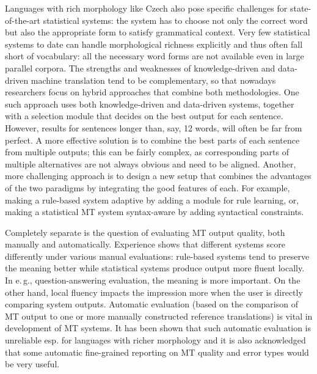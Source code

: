 \begin{multicols}{2}
Languages with rich morphology like Czech also pose specific challenges for state-of-the-art statistical systems: the system has to choose not only the correct word but also the appropriate form to satisfy grammatical context. Very few statistical systems to date can handle morphological richness explicitly and thus often fall short of vocabulary: all the necessary word forms are not available even in large parallel corpora.
The strengths and weaknesses of knowledge-driven and data-driven machine translation tend to be complementary, so that nowadays researchers focus on hybrid approaches that combine both methodologies. One such approach uses both knowledge-driven and data-driven systems, together with a selection module that decides on the best output for each sentence. However, results for sentences longer than, say, 12 words, will often be far from perfect. A more effective solution is to combine the best parts of each sentence from multiple outputs; this can be fairly complex, as corresponding parts of multiple alternatives are not always obvious and need to be aligned. Another, more challenging approach is to design a new setup that combines the advantages of the two paradigms by integrating the good features of each. For example, making a rule-based system adaptive by adding a module for rule learning, or, making a statistical MT system syntax-aware by adding syntactical constraints.

Completely separate is the question of evaluating MT output quality, both manually and automatically. Experience shows that different systems score differently under various manual evaluations: rule-based systems tend to preserve the meaning better while statistical systems produce output more fluent locally. In e.\,g., question-answering evaluation, the meaning is more important. On the other hand, local fluency impacts the impression more when the user is directly comparing system outputs. Automatic evaluation (based on the comparison of MT output to one or more manually constructed reference translations) is vital in development of MT systems. It has been shown that such automatic evaluation is unreliable esp. for languages with richer morphology and it is also acknowledged that some automatic fine-grained reporting on MT quality and error types would be very useful.




\end{multicols}
